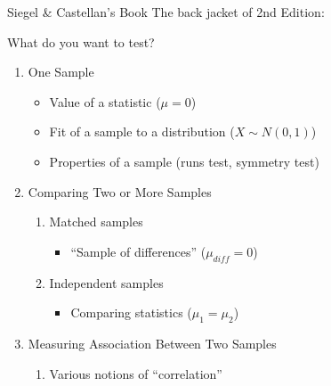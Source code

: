 \begin{frame}{Siegel \& Castellan's Book}
The back jacket of 2nd Edition:
\br

What do you want to test?
\begin{enumerate}
    \item One Sample
    \begin{itemize}
        \item Value of a statistic ($\mu=0$)
        \item Fit of a sample to a distribution ($X\sim N(0,1)$)
        \item Properties of a sample (runs test, symmetry test)
    \end{itemize}
    \item Comparing Two or More Samples
    \begin{enumerate}
        \item Matched samples
        \begin{itemize}
            \item ``Sample of differences'' ($\mu_{diff}=0$)
        \end{itemize}
        \item Independent samples
        \begin{itemize}
            \item Comparing statistics ($\mu_1 = \mu_2$)
        \end{itemize}
    \end{enumerate}
    \item Measuring Association Between Two Samples
    \begin{enumerate}
        \item Various notions of ``correlation''
    \end{enumerate}
\end{enumerate}
\end{frame}

